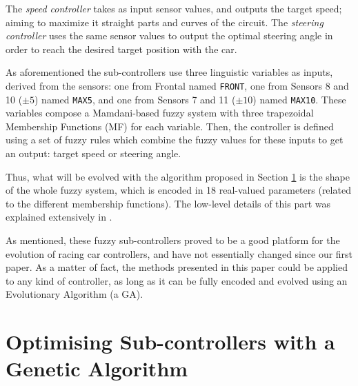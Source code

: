 \documentclass[10pt,journal,compsoc]{IEEEtran}
\begin{document}
The \textit{speed controller} takes as input sensor values, and
outputs the target speed; aiming to maximize it straight parts and curves of the circuit. The \textit{steering controller} uses the same sensor values to output the optimal steering angle in order to reach the desired target position with the car.

As aforementioned the sub-controllers use three linguistic variables as inputs, derived from the sensors: one from Frontal named \texttt{FRONT}, one from Sensors 8 and 10 ($\pm 5$\textdegree) named \texttt{MAX5}, and one from Sensors 7 and 11 ($\pm 10$\textdegree) named \texttt{MAX10}. These variables compose a Mamdani-based fuzzy system \cite{iancu2012} with three trapezoidal Membership Functions (MF) for each variable.
Then, the controller is defined using a set of fuzzy rules which combine the fuzzy values for these inputs to get an output: target speed or steering angle.

Thus, what will be evolved with the algorithm proposed in Section \ref{sec:ga} is the shape of the whole fuzzy system, which is encoded in 18 real-valued parameters (related to the different membership functions). The low-level details of this part was explained extensively in \cite{DBLP:conf/cig/SalemMG19}. 

As mentioned, these fuzzy sub-controllers proved to be a good platform for the evolution of racing car controllers, and have not essentially changed since our first paper. As a matter of fact, the methods presented in this paper could
be applied to any kind of controller, as long as it can be fully
encoded and evolved using an Evolutionary Algorithm (a GA).




\section{Optimising Sub-controllers with a Genetic Algorithm}
\label{sec:ga}



\end{document}
